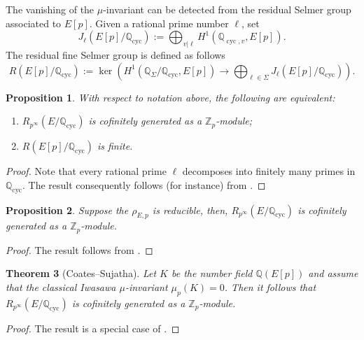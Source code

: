 \documentclass[12pt]{amsart}
\newtheorem{theorem}{Theorem}[section]
\newtheorem{proposition}[theorem]{Proposition}
\newcommand{\Z}{\mathbb{Z}}
\newcommand{\Q}{\mathbb{Q}}
\newcommand{\op}[1]{\operatorname{#1}}
\numberwithin{equation}{section}
\begin{document}
\par The vanishing of the $\mu$-invariant can be detected from the residual Selmer group associated to $E[p]$. Given a rational prime number $\ell$, set
\[J_\ell(E[p]/\Q_{\op{cyc}}):=\bigoplus_{v|\ell} H^1(\Q_{\op{cyc}, v}, E[p]).\]
The residual fine Selmer group is defined as follows 
\[R(E[p]/\Q_{\op{cyc}}):=\op{ker}\left( H^1(\Q_{\Sigma}/\Q_{\op{cyc}}, E[p])\longrightarrow \bigoplus_{\ell\in \Sigma} J_\ell(E[p]/\Q_{\op{cyc}})\right). \]
\begin{proposition}\label{residual fine selmer finite implies conjecture A}
    With respect to notation above, the following are equivalent:
    \begin{enumerate}
        \item $R_{p^\infty}(E/\Q_{\op{cyc}})$ is cofinitely generated as a $\Z_p$-module;
        \item $R(E[p]/\Q_{\op{cyc}})$ is finite.
    \end{enumerate}
\end{proposition}
\begin{proof}
    Note that every rational prime $\ell$ decomposes into finitely many primes in $\Q_{\op{cyc}}$. The result consequently follows (for instance) from \cite[Proposition 3.1]{RayRamanujanJcorank}.
\end{proof}

\begin{proposition}\label{reducible mu=0}
    Suppose the $\rho_{E,p}$ is reducible, then, $R_{p^\infty}(E/\Q_{\op{cyc}})$ is cofinitely generated as a $\Z_p$-module.
\end{proposition}
\begin{proof}
    The result follows from \cite[Proposition 2.4]{arithstatsfineselmer}.
\end{proof}

\begin{theorem}[Coates--Sujatha]
    Let $K$ be the number field $\Q(E[p])$ and assume that the classical Iwasawa $\mu$-invariant $\mu_p(K)=0$. Then it follows that $R_{p^\infty}(E/\Q_{\op{cyc}})$ is cofinitely generated as a $\Z_p$-module.
\end{theorem}
\begin{proof}
    The result is a special case of \cite[Corollary 3.5]{CoatesSujathaMathAnnalen}.
\end{proof}
\end{document}
